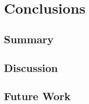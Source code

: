 
\chapter{Conclusions}
\label{chap:concl}

\section*{}


\section{Summary} %
\label{sec:summary}




\section{Discussion} %
\label{sec:discussion}



\section{Future Work} %
\label{sec:future_work}


